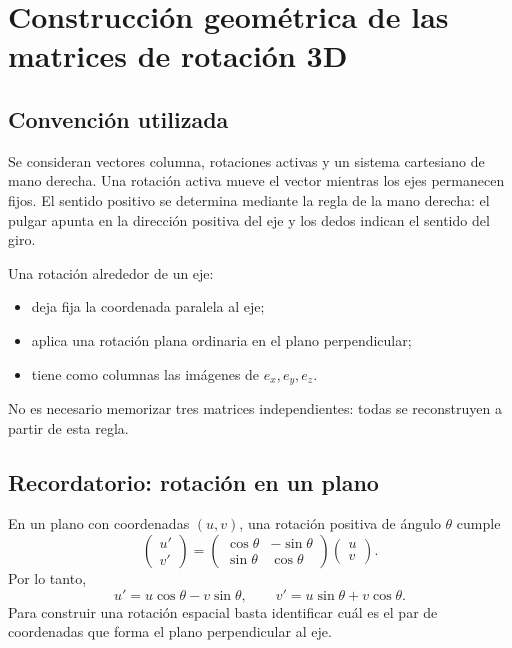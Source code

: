 \section{Construcción geométrica de las matrices de rotación 3D}\label{cap:rot3d}\label{ap:rot3d}

\subsection{Convención utilizada}

Se consideran vectores columna, rotaciones activas y un sistema cartesiano de mano derecha.
Una rotación activa mueve el vector mientras los ejes permanecen fijos. El sentido positivo
se determina mediante la regla de la mano derecha: el pulgar apunta en la dirección positiva
del eje y los dedos indican el sentido del giro.

\begin{idea}
Una rotación alrededor de un eje:
\begin{itemize}
  \item deja fija la coordenada paralela al eje;
  \item aplica una rotación plana ordinaria en el plano perpendicular;
  \item tiene como columnas las imágenes de \(e_x,e_y,e_z\).
\end{itemize}
No es necesario memorizar tres matrices independientes: todas se reconstruyen a partir de
esta regla.
\end{idea}

\subsection{Recordatorio: rotación en un plano}

En un plano con coordenadas \((u,v)\), una rotación positiva de ángulo \(\theta\) cumple
\[
\begin{pmatrix}u'\\v'\end{pmatrix}
=
\begin{pmatrix}
\cos\theta&-\sin\theta\\
\sin\theta& \cos\theta
\end{pmatrix}
\begin{pmatrix}u\\v\end{pmatrix}.
\]
Por lo tanto,
\[
u'=u\cos\theta-v\sin\theta,
\qquad
v'=u\sin\theta+v\cos\theta.
\]
Para construir una rotación espacial basta identificar cuál es el par de coordenadas que
forma el plano perpendicular al eje.


